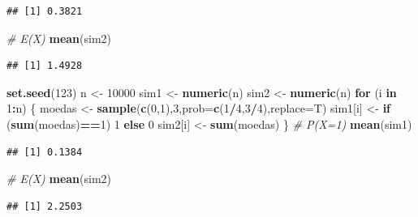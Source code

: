 \documentclass[
]{book}
\newenvironment{Shaded}{\begin{snugshade}}{\end{snugshade}}
\newcommand{\AttributeTok}[1]{\textcolor[rgb]{0.13,0.29,0.53}{#1}}
\newcommand{\CommentTok}[1]{\textcolor[rgb]{0.56,0.35,0.01}{\textit{#1}}}
\newcommand{\ControlFlowTok}[1]{\textcolor[rgb]{0.13,0.29,0.53}{\textbf{#1}}}
\newcommand{\DecValTok}[1]{\textcolor[rgb]{0.00,0.00,0.81}{#1}}
\newcommand{\FunctionTok}[1]{\textcolor[rgb]{0.13,0.29,0.53}{\textbf{#1}}}
\newcommand{\NormalTok}[1]{#1}
\newcommand{\OtherTok}[1]{\textcolor[rgb]{0.56,0.35,0.01}{#1}}
\newcommand{\SpecialCharTok}[1]{\textcolor[rgb]{0.81,0.36,0.00}{\textbf{#1}}}
\begin{document}
\begin{verbatim}
## [1] 0.3821
\end{verbatim}

\begin{Shaded}
\begin{Highlighting}[]
\CommentTok{\# E(X)}
\FunctionTok{mean}\NormalTok{(sim2)}
\end{Highlighting}
\end{Shaded}

\begin{verbatim}
## [1] 1.4928
\end{verbatim}

\begin{Shaded}
\begin{Highlighting}[]
\FunctionTok{set.seed}\NormalTok{(}\DecValTok{123}\NormalTok{)}
\NormalTok{n }\OtherTok{\textless{}{-}} \DecValTok{10000}
\NormalTok{sim1 }\OtherTok{\textless{}{-}} \FunctionTok{numeric}\NormalTok{(n)}
\NormalTok{sim2 }\OtherTok{\textless{}{-}} \FunctionTok{numeric}\NormalTok{(n)}
\ControlFlowTok{for}\NormalTok{ (i }\ControlFlowTok{in} \DecValTok{1}\SpecialCharTok{:}\NormalTok{n) \{}
\NormalTok{  moedas }\OtherTok{\textless{}{-}} \FunctionTok{sample}\NormalTok{(}\FunctionTok{c}\NormalTok{(}\DecValTok{0}\NormalTok{,}\DecValTok{1}\NormalTok{),}\DecValTok{3}\NormalTok{,}\AttributeTok{prob=}\FunctionTok{c}\NormalTok{(}\DecValTok{1}\SpecialCharTok{/}\DecValTok{4}\NormalTok{,}\DecValTok{3}\SpecialCharTok{/}\DecValTok{4}\NormalTok{),}\AttributeTok{replace=}\NormalTok{T)}
\NormalTok{  sim1[i] }\OtherTok{\textless{}{-}} \ControlFlowTok{if}\NormalTok{ (}\FunctionTok{sum}\NormalTok{(moedas)}\SpecialCharTok{==}\DecValTok{1}\NormalTok{) }\DecValTok{1} \ControlFlowTok{else} \DecValTok{0}
\NormalTok{  sim2[i] }\OtherTok{\textless{}{-}} \FunctionTok{sum}\NormalTok{(moedas)}
\NormalTok{\}}
\CommentTok{\# P(X=1)}
\FunctionTok{mean}\NormalTok{(sim1)}
\end{Highlighting}
\end{Shaded}

\begin{verbatim}
## [1] 0.1384
\end{verbatim}

\begin{Shaded}
\begin{Highlighting}[]
\CommentTok{\# E(X)}
\FunctionTok{mean}\NormalTok{(sim2)}
\end{Highlighting}
\end{Shaded}

\begin{verbatim}
## [1] 2.2503
\end{verbatim}
\end{document}
